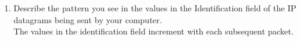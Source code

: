 \begin{enumerate}[label=\bfseries Problem \arabic*:,leftmargin=*,labelindent=1em]
        \item Describe the pattern you see in the values in the Identification field of the IP datagrams being sent by your computer.\\[0.2mm]
        \soln The values in the identification field increment with each subsequent packet.
\end{enumerate}